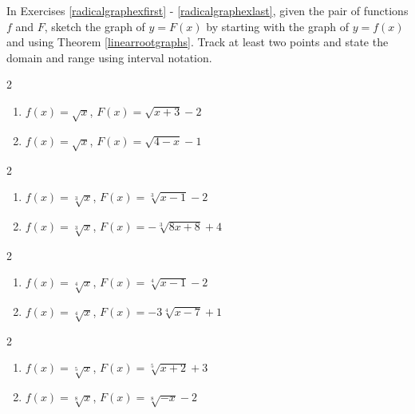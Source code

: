 \documentclass{ximera}
\begin{document}
	\author{Stitz-Zeager}



In Exercises \ref{radicalgraphexfirst} - \ref{radicalgraphexlast},  given the pair of functions $f$ and $F$, sketch the graph of $y=F(x)$ by starting with the graph of $y = f(x)$ and using Theorem \ref{linearrootgraphs}.   Track at least two points and state the domain and range using interval notation.

\begin{multicols}{2}
\begin{enumerate}

\item $f(x) = \sqrt{x}$, $F(x) = \sqrt{x+3}-2$ \label{radicalgraphexfirst}
\item $f(x) = \sqrt{x}$, $F(x) = \sqrt{4-x}-1$ 

\setcounter{HW}{\value{enumi}}
\end{enumerate}
\end{multicols}

\begin{multicols}{2}
\begin{enumerate}
\setcounter{enumi}{\value{HW}}
\item $f(x) = \sqrt[3]{x}$, $F(x) = \sqrt[3]{x-1}-2$ 
\item $f(x) = \sqrt[3]{x}$, $F(x) = -\sqrt[3]{8x + 8} + 4$ 

\setcounter{HW}{\value{enumi}}
\end{enumerate}
\end{multicols}

\begin{multicols}{2}
\begin{enumerate}
\setcounter{enumi}{\value{HW}}

\item $f(x) = \sqrt[4]{x}$, $F(x) = \sqrt[4]{x-1}-2$
\item $f(x) = \sqrt[4]{x}$, $F(x) = -3\sqrt[4]{x - 7} +1$

\setcounter{HW}{\value{enumi}}
\end{enumerate}
\end{multicols}

\begin{multicols}{2}
\begin{enumerate}
\setcounter{enumi}{\value{HW}}

\item $f(x) = \sqrt[5]{x}$, $F(x) = \sqrt[5]{x + 2} + 3$
\item $f(x) = \sqrt[8]{x}$, $F(x) = \sqrt[8]{-x} - 2$ \label{radicalgraphexlast}
\setcounter{HW}{\value{enumi}}
\end{enumerate}
\end{multicols}
\end{document}
